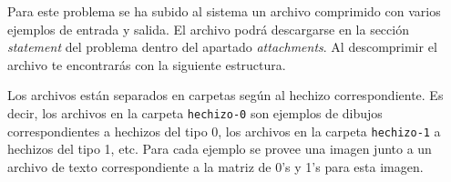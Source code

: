 \documentclass{oci}
\begin{document}
\begin{sampleDescription}
  Para este problema se ha subido al sistema un archivo comprimido con varios
  ejemplos de entrada y salida.
  El archivo podrá descargarse en la sección \emph{statement} del problema dentro
  del apartado \emph{attachments}.
  Al descomprimir el archivo te encontrarás con la siguiente estructura.


  Los archivos están separados en carpetas según al hechizo correspondiente.
  Es decir, los archivos en la carpeta {\tt hechizo-0} son ejemplos de dibujos
  correspondientes a hechizos del tipo 0, los archivos en la carpeta {\tt hechizo-1} a
  hechizos del tipo 1, etc.
  Para cada ejemplo se provee una imagen junto a un archivo de texto
  correspondiente a la matriz de 0's y 1's para esta imagen.
  

\end{sampleDescription}
\end{document}
